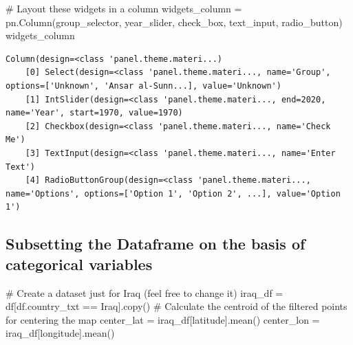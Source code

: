 \documentclass[
  letterpaper,
  DIV=11,
  numbers=noendperiod]{scrreprt}
\newenvironment{Shaded}{\begin{snugshade}}{\end{snugshade}}
\newcommand{\CommentTok}[1]{\textcolor[rgb]{0.37,0.37,0.37}{#1}}
\newcommand{\NormalTok}[1]{\textcolor[rgb]{0.00,0.23,0.31}{#1}}
\newcommand{\OperatorTok}[1]{\textcolor[rgb]{0.37,0.37,0.37}{#1}}
\newcommand{\StringTok}[1]{\textcolor[rgb]{0.13,0.47,0.30}{#1}}
\begin{document}
\begin{Shaded}
\begin{Highlighting}[]
\CommentTok{\# Layout these widgets in a column}
\NormalTok{widgets\_column }\OperatorTok{=}\NormalTok{ pn.Column(group\_selector, year\_slider, check\_box, text\_input, radio\_button)}
\NormalTok{widgets\_column}
\end{Highlighting}
\end{Shaded}

\begin{verbatim}
Column(design=<class 'panel.theme.materi...)
    [0] Select(design=<class 'panel.theme.materi..., name='Group', options=['Unknown', 'Ansar al-Sunn...], value='Unknown')
    [1] IntSlider(design=<class 'panel.theme.materi..., end=2020, name='Year', start=1970, value=1970)
    [2] Checkbox(design=<class 'panel.theme.materi..., name='Check Me')
    [3] TextInput(design=<class 'panel.theme.materi..., name='Enter Text')
    [4] RadioButtonGroup(design=<class 'panel.theme.materi..., name='Options', options=['Option 1', 'Option 2', ...], value='Option 1')
\end{verbatim}

\subsection{Subsetting the Dataframe on the basis of categorical
variables}\label{subsetting-the-dataframe-on-the-basis-of-categorical-variables}

\begin{Shaded}
\begin{Highlighting}[]
\CommentTok{\# Create a dataset just for Iraq (feel free to change it)}
\NormalTok{iraq\_df }\OperatorTok{=}\NormalTok{ df[df.country\_txt }\OperatorTok{==} \StringTok{\textquotesingle{}Iraq\textquotesingle{}}\NormalTok{].copy()}
\CommentTok{\# Calculate the centroid of the filtered points for centering the map}
\NormalTok{center\_lat }\OperatorTok{=}\NormalTok{ iraq\_df[}\StringTok{\textquotesingle{}latitude\textquotesingle{}}\NormalTok{].mean()}
\NormalTok{center\_lon }\OperatorTok{=}\NormalTok{ iraq\_df[}\StringTok{\textquotesingle{}longitude\textquotesingle{}}\NormalTok{].mean()}
\end{Highlighting}
\end{Shaded}
\end{document}
